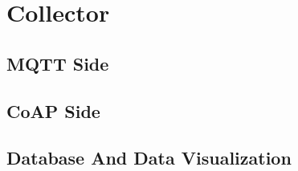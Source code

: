 \section{Collector}

\subsection{MQTT Side}

\subsection{CoAP Side}

\subsection{Database And Data Visualization}

